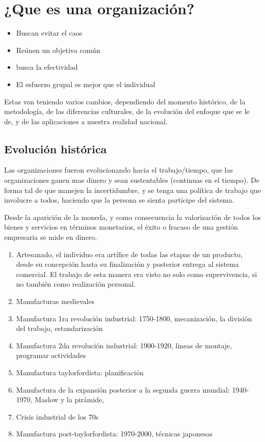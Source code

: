 \documentclass[titlepage,a4paper]{article}
\begin{document}


\section{¿Que es una organización?}
\begin{itemize}
    \item Buscan evitar el caos
    \item Reúnen un objetivo común
    \item busca la efectividad
    \item El esfuerzo grupal es mejor que el individual
\end{itemize}

Estas van teniendo varios cambios, dependiendo del momento histórico, de la metodología, de las diferencias culturales, de la evolución del enfoque que se le de, y de las aplicaciones a nuestra realidad nacional.

\subsection{Evolución histórica}
Las organizaciones fueron evolucionando hacia el trabajo/tiempo, que las organizaciones ganen mas dinero y sean sustentables (continuas en el tiempo). De forma tal de que manejen la incertidumbre, y se tenga una política de trabajo que involucre a todos, haciendo que la persona se sienta participe del sistema.

Desde la aparición de la moneda, y como consecuencia la valorización de todos los bienes y servicios en términos monetarios, el éxito o fracaso de una gestión empresaria se mide en dinero.

\begin{enumerate}
    \item Artesanado, el individuo era artífice de todas las etapas de un producto, desde su concepción hasta su finalización y posterior entrega al sistema comercial. El trabajo de esta manera era visto no solo como supervivencia, si no también como realización personal.
    \item Manufacturas medievales
    \item Manufactura 1ra revolución industrial: 1750-1800, mecanización, la división del trabajo, estandarización
    \item Manufactura 2da revolución industrial: 1900-1920, lineas de montaje, programar actividades
    \item Manufactura taylorfordista: planificación
    \item Manufactura de la expansión posterior a la segunda guerra mundial: 1940-1970,  Maslow y la pirámide,
    \item Crisis industrial de los 70s
    \item Manufactura post-taylorfordista: 1970-2000, técnicas japonesas
\end{enumerate}
\end{document}
